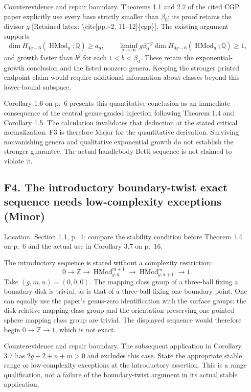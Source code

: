 \documentclass[10pt]{article}
\begin{document}
Counterevidence and repair boundary. Theorems 1.1 and 2.7 of the cited CGP paper explicitly use every base strictly smaller than \(\beta_0\); its proof retains the divisor \(g\) [Retained latex: \textbackslash{}cite[pp.\textasciitilde{}2, 11--12]\{cgp\}]. The existing argument supports \[\dim H_{4g-6}(\operatorname{HMod}_g;\mathbb Q)\ge a_g,\qquad
 \liminf_{g\to\infty}g\beta_0^{-g}
        \dim H_{4g-6}(\operatorname{HMod}_g;\mathbb Q)\ge1,\] and growth faster than \(b^g\) for each \(1<b<\beta_0\). These retain the exponential-growth conclusion and the listed nonzero genera. Keeping the stronger printed endpoint claim would require additional information about classes beyond this lower-bound subspace.\par
Corollary 1.6 on p. 6 presents this quantitative conclusion as an immediate consequence of the central genus-graded injection following Theorem 1.4 and Corollary 1.5. The calculation invalidates that deduction at the stated critical normalization. F3 is therefore Major for the quantitative derivation. Surviving nonvanishing genera and qualitative exponential growth do not establish the stronger guarantee. The actual handlebody Betti sequence is not claimed to violate it.\par
\subsection*{F4. The introductory boundary-twist exact sequence needs low-complexity exceptions (Minor)}
Location. Section 1.1, p. 1; compare the stability condition before Theorem 1.4 on p. 6 and the actual use in Corollary 3.7 on p. 16.\par
The introductory sequence is stated without a complexity restriction: \[0\longrightarrow\mathbb Z\longrightarrow\operatorname{HMod}^{m+1}_{g,n}
       \longrightarrow\operatorname{HMod}^m_{g,n+1}\longrightarrow1.\] Take \((g,m,n)=(0,0,0)\). The mapping class group of a three-ball fixing a boundary disk is trivial, as is that of a three-ball fixing one boundary point. One can equally use the paper’s genus-zero identification with the surface groups: the disk-relative mapping class group and the orientation-preserving one-pointed sphere mapping class group are trivial. The displayed sequence would therefore begin \(0\to\mathbb Z\to1\), which is not exact.\par
Counterevidence and repair boundary. The subsequent application in Corollary 3.7 has \(2g-2+n+m>0\) and excludes this case. State the appropriate stable range or low-complexity exceptions at the introductory assertion. This is a range qualification, not a failure of the boundary-twist argument in its actual stable application.\par
\end{document}
